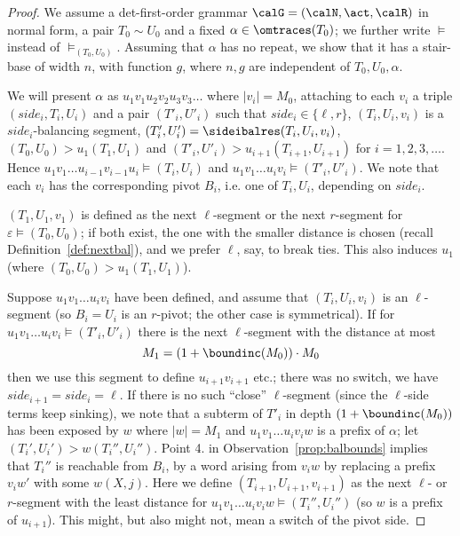 \documentclass[12pt]{article}
\begin{document}
\begin{proof}
We assume a det-first-order grammar $\calG=(\calN,\act,\calR)$ in
normal form,
a pair $T_0\sim U_0$ and a fixed $\alpha\in\omtraces(T_0)$; 
we further write
$\models$ instead of $\models_{(T_0,U_0)}$. 
Assuming that $\alpha$ has no repeat, we show that it has
a stair-base of
width $n$, with function $g$, where $n,g$ are independent of
$T_0,U_0,\alpha$.

We will present $\alpha$ as $u_1v_1u_2v_2u_3v_3\dots$ where $|v_i|=M_0$,
attaching to each $v_i$ a triple $(side_i,T_i,U_i)$ and a pair 
$(T'_i,U'_i)$
such that
$side_i\in\{\ell,r\}$, $(T_i,U_i,v_i)$ is a $side_i$-balancing
segment,  $(T'_i,U'_i)=\sideibalres(T_i,U_i,v_i)$,
$(T_0,U_0)\gt{u_1}(T_1,U_1)$ and
$(T'_i,U'_i)\gt{u_{i+1}}(T_{i+1},U_{i+1})$ for $i=1,2,3,\dots$.
Hence  $u_1v_1\dots u_{i-1}v_{i-1}u_i\models (T_i,U_i)$ and
 $u_1v_1\dots u_{i}v_{i}\models (T'_i,U'_i)$.
We note that each $v_i$ has the corresponding pivot
$B_i$, i.e. one of $T_i, U_i$, depending on $side_i$.

$(T_1,U_1,v_1)$ is defined as the next $\ell$-segment
or the next $r$-segment for $\varepsilon\models (T_0,U_0)$; if both
exist, the one with the 
smaller distance is chosen
(recall Definition~\ref{def:nextbal}), and  we prefer
$\ell$, say, to break ties. This also induces $u_1$ 
(where $(T_0,U_0)\gt{u_1}(T_1,U_1)$). 

Suppose $u_1v_1\dots u_iv_i$ 
have been
defined, and assume that $(T_i,U_i,v_i)$ is an $\ell$-segment 
(so $B_i=U_i$ is an $r$-pivot; the other case is symmetrical). 
If for $u_1v_1\dots u_{i}v_{i}\models (T'_i,U'_i)$
there is the next $\ell$-segment
with the distance at most
\begin{equation}\label{eq:Mone}
M_1=(1+\boundinc(M_0))\cdot M_0
\end{equation}
then we use 
this segment to define $u_{i+1}v_{i+1}$ etc.; there was no switch, we
have $side_{i+1}=side_i=\ell$.
If there is no such ``close'' 
$\ell$-segment (since the $\ell$-side terms keep sinking),
we note
that a subterm of $T'_i$ in depth $(1+ \boundinc(M_0))$ has been
exposed by $w$ where $|w|=M_1$ and 
$u_1v_1\dots u_{i}v_{i}w$ is a prefix of $\alpha$;
let $(T_i',U_i')\gt{w}(T_i'',U_i'')$. 
Point 4. in Observation~\ref{prop:balbounds} implies that 
$T_i''$ is reachable from $B_i$, by a word arising from $v_iw$ by
replacing a prefix $v_iw'$ with some $w(X,j)$.
Here we define 
$(T_{i+1},U_{i+1},v_{i+1})$ as the 
next $\ell$- or $r$-segment
with the least distance for 
$u_1v_1\dots u_{i}v_{i}w\models (T_i'',U_i'')$ (so $w$ is a
prefix of $u_{i+1}$).
This might, but also might not, mean a switch of the pivot side.


\end{proof}
\end{document}
